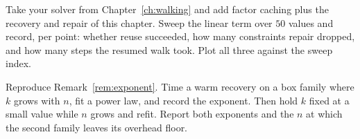 \begin{exercises}
\begin{exercise}[Implementation]
Take your solver from Chapter~\ref{ch:walking} and add factor caching plus the recovery
and repair of this chapter. Sweep the linear term over $50$ values and record, per
point: whether reuse succeeded, how many constraints repair dropped, and how many steps
the resumed walk took. Plot all three against the sweep index.
\end{exercise}

\begin{exercise}[Implementation]
Reproduce Remark~\ref{rem:exponent}. Time a warm recovery on a box family where $k$
grows with $n$, fit a power law, and record the exponent. Then hold $k$ fixed at a small
value while $n$ grows and refit. Report both exponents and the $n$ at which the second
family leaves its overhead floor.
\end{exercise}

\end{exercises}
